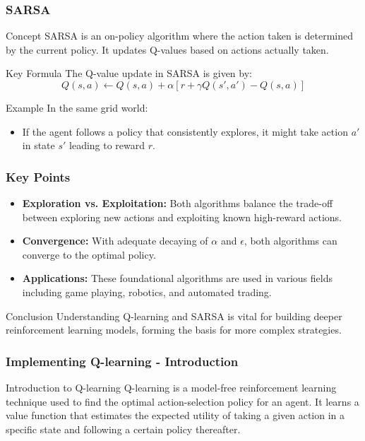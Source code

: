 \documentclass[aspectratio=169]{beamer}
\begin{document}
\begin{frame}[fragile]
    \frametitle{SARSA}
    \begin{block}{Concept}
        SARSA is an on-policy algorithm where the action taken is determined by the current policy. It updates Q-values based on actions actually taken.
    \end{block}

    \begin{block}{Key Formula}
        The Q-value update in SARSA is given by:
        \begin{equation}
        Q(s, a) \leftarrow Q(s, a) + \alpha \left[ r + \gamma Q(s', a') - Q(s, a) \right]
        \end{equation}
    \end{block}
    
    \begin{block}{Example}
        In the same grid world:
        \begin{itemize}
            \item If the agent follows a policy that consistently explores, it might take action $a'$ in state $s'$ leading to reward $r$.
        \end{itemize}
    \end{block}
\end{frame}

\begin{frame}[fragile]
    \frametitle{Key Points}
    \begin{itemize}
        \item \textbf{Exploration vs. Exploitation:} Both algorithms balance the trade-off between exploring new actions and exploiting known high-reward actions.
        \item \textbf{Convergence:} With adequate decaying of $\alpha$ and $\epsilon$, both algorithms can converge to the optimal policy.
        \item \textbf{Applications:} These foundational algorithms are used in various fields including game playing, robotics, and automated trading.
    \end{itemize}

    \begin{block}{Conclusion}
        Understanding Q-learning and SARSA is vital for building deeper reinforcement learning models, forming the basis for more complex strategies.
    \end{block}
\end{frame}

\begin{frame}
    \frametitle{Implementing Q-learning - Introduction}
    \begin{block}{Introduction to Q-learning}
        Q-learning is a model-free reinforcement learning technique used to find the optimal action-selection policy for an agent. It learns a value function that estimates the expected utility of taking a given action in a specific state and following a certain policy thereafter.
    \end{block}
\end{frame}
\end{document}
